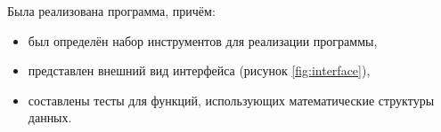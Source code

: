 Была реализована программа, причём:
\begin{itemize}
	\item был определён набор инструментов для реализации программы,
	\item представлен внешний вид интерфейса (рисунок \ref{fig:interface}),
	\item составлены тесты для функций, использующих математические структуры данных.
\end{itemize}




